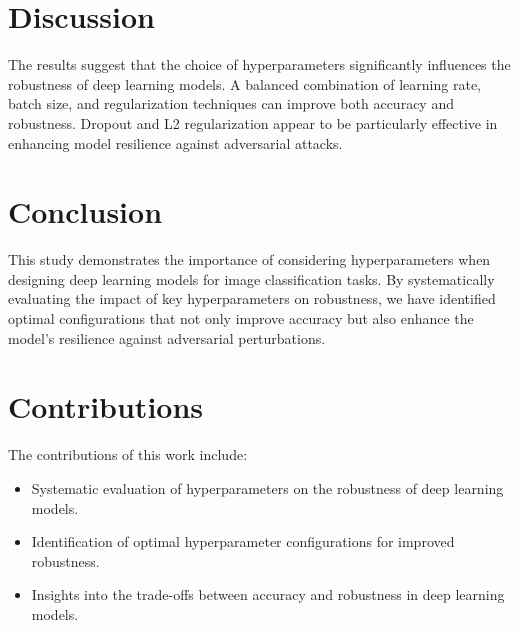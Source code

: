 \documentclass{article}
\begin{document}
\section{Discussion}
The results suggest that the choice of hyperparameters significantly influences the robustness of deep learning models. A balanced combination of learning rate, batch size, and regularization techniques can improve both accuracy and robustness. Dropout and L2 regularization appear to be particularly effective in enhancing model resilience against adversarial attacks.

\section{Conclusion}
This study demonstrates the importance of considering hyperparameters when designing deep learning models for image classification tasks. By systematically evaluating the impact of key hyperparameters on robustness, we have identified optimal configurations that not only improve accuracy but also enhance the model’s resilience against adversarial perturbations.

\section{Contributions}
The contributions of this work include:
\begin{itemize}
    \item Systematic evaluation of hyperparameters on the robustness of deep learning models.
    \item Identification of optimal hyperparameter configurations for improved robustness.
    \item Insights into the trade-offs between accuracy and robustness in deep learning models.
\end{itemize}



\end{document}
